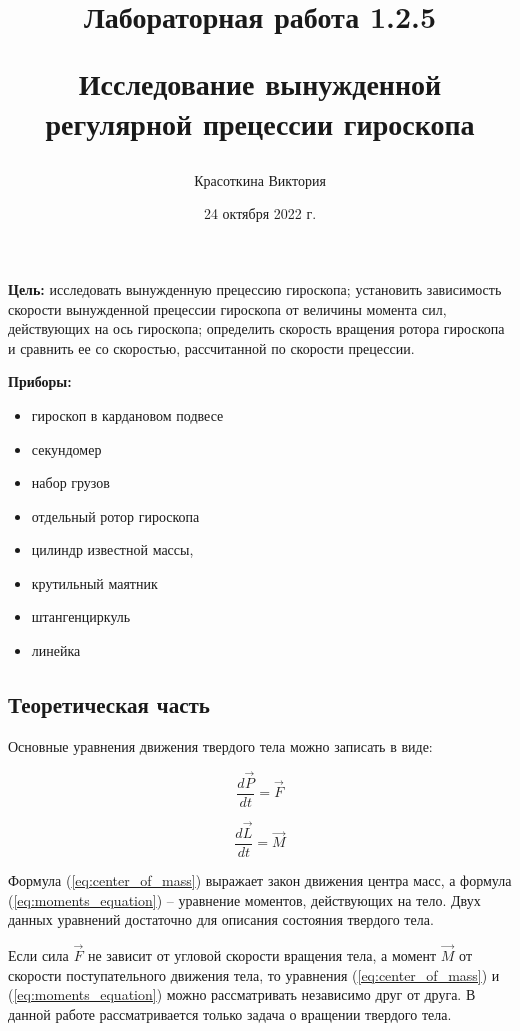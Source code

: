 \documentclass[a4paper,12pt]{article}
\author{Красоткина Виктория}
\title{Лабораторная работа 1.2.5

Исследование вынужденной регулярной прецессии гироскопа}
\date{24 октября 2022 г.}
\begin{document}
\maketitle
\thispagestyle{empty}

\newpage
\setcounter{page}{1}

	\textbf{Цель:} исследовать вынужденную прецессию гироскопа; установить зависимость скорости вынужденной прецессии гироскопа от величины момента сил, действующих на ось гироскопа; определить скорость вращения ротора гироскопа и сравнить ее со скоростью, рассчитанной по скорости прецессии.
	
	\textbf{Приборы:} 
	\begin{itemize}
		\item гироскоп в кардановом подвесе
		\item секундомер
		\item набор грузов
		\item отдельный ротор гироскопа
		\item цилиндр известной массы,
		\item крутильный маятник
		\item штангенциркуль
		\item линейка
	\end{itemize}


\subsection*{Теоретическая часть}

Основные уравнения движения твердого тела можно записать в виде:

\begin{equation}
	\frac{d\vec{P}}{dt} = \vec{F}
	\label{eq:center_of_mass}
\end{equation}

\begin{equation}
	\frac{d\vec{L}}{dt} = \vec{M}
	\label{eq:moments_equation}
\end{equation}

Формула (\ref{eq:center_of_mass}) выражает закон движения центра масс, а формула (\ref{eq:moments_equation}) -- уравнение моментов, действующих на тело. Двух данных уравнений достаточно для описания состояния твердого тела.

Если сила $\vec{F}$ не зависит от угловой скорости вращения тела, а момент $\vec{M}$ от скорости поступательного движения тела, то уравнения (\ref{eq:center_of_mass}) и (\ref{eq:moments_equation}) можно рассматривать независимо друг от друга. В данной работе рассматривается только задача о вращении твердого тела.
\end{document}
